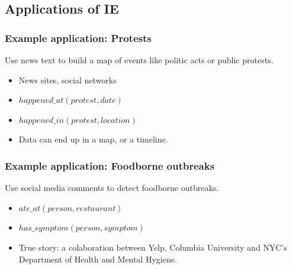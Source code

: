 \documentclass{beamer}
\begin{document}




\subsection{Applications of IE}

\begin{frame}
\frametitle{Example application: Protests}

\pause

\begin{block}{ }
Use news text to build a map of events like politic acts or public protests.
\end{block}

\pause

\begin{itemize}
 \item News sites, social networks
 \item $happened\_at(protest, date)$
 \item $happened\_in(protest, location)$
 \item Data can end up in a map, or a timeline.
\end{itemize}

\end{frame}


\begin{frame}
\frametitle{Example application: Foodborne outbreaks}

\begin{block}{ }
Use social media comments to detect foodborne outbreaks.
\end{block}

\pause

\begin{itemize}
 \item $ate\_at(person, restaurant)$
 \item $has\_symptom(person, symptom)$
 \item True story: a colaboration between Yelp, Columbia University and NYC's
       Department of Health and Mental Hygiene.
\end{itemize}

\end{frame}
\end{document}
